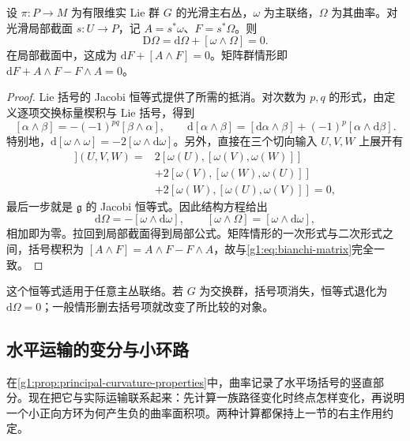 \begin{theorem}\label{g1:thm:principal-bianchi}
	设 \(\pi:P\to M\) 为有限维实 Lie 群 \(G\) 的光滑主右丛，\(\omega\) 为主联络，\(\Omega\) 为其曲率。对光滑局部截面 \(s:U\to P\)，记 \(A=s^*\omega\)、\(F=s^*\Omega\)。则
	\begin{equation}\label{g1:eq:principal-bianchi}
		\mathrm{D}\Omega=\mathrm{d}\Omega+[\omega\wedge\Omega]=0.
	\end{equation}
	在局部截面中，这成为 \(\mathrm{d}F+[A\wedge F]=0\)。矩阵群情形即 \(\mathrm{d}F+A\wedge F-F\wedge A=0\)。
\end{theorem}
\begin{proof}
	Lie 括号的 Jacobi 恒等式提供了所需的抵消。对次数为 \(p,q\) 的形式，由定义逐项交换标量楔积与 Lie 括号，得到
	\[
		[\alpha\wedge\beta]=-(-1)^{pq}[\beta\wedge\alpha],\qquad
		\mathrm{d}[\alpha\wedge\beta]=[\mathrm{d}\alpha\wedge\beta]+(-1)^p[\alpha\wedge\mathrm{d}\beta].
	\]
	特别地，\(\mathrm{d}[\omega\wedge\omega]=-2[\omega\wedge\mathrm{d}\omega]\)。另外，直接在三个切向输入 \(U,V,W\) 上展开有
	\begin{align*}
		[\omega\wedge[\omega\wedge\omega]](U,V,W)
		={}&2[\omega(U),[\omega(V),\omega(W)]]\\
		&+2[\omega(V),[\omega(W),\omega(U)]]\\
		&+2[\omega(W),[\omega(U),\omega(V)]]=0,
	\end{align*}
	最后一步就是 \(\mathfrak g\) 的 Jacobi 恒等式。因此结构方程给出
	\[
		\mathrm{d}\Omega=-[\omega\wedge\mathrm{d}\omega],\qquad
		[\omega\wedge\Omega]=[\omega\wedge\mathrm{d}\omega],
	\]
	相加即为零。拉回到局部截面得到局部公式。矩阵情形的一次形式与二次形式之间，括号楔积为 \([A\wedge F]=A\wedge F-F\wedge A\)，故与\eqref{g1:eq:bianchi-matrix}完全一致。
\end{proof}

这个恒等式适用于任意主丛联络。若 \(G\) 为交换群，括号项消失，恒等式退化为 \(\mathrm{d}\Omega=0\)；一般情形删去括号项就改变了所比较的对象。

\subsection{水平运输的变分与小环路}
\label{g1:subsec:1803:04}

在\cref{g1:prop:principal-curvature-properties}中，曲率记录了水平场括号的竖直部分。现在把它与实际运输联系起来：先计算一族路径变化时终点怎样变化，再说明一个小正向方环为何产生负的曲率面积项。两种计算都保持上一节的右主作用约定。

